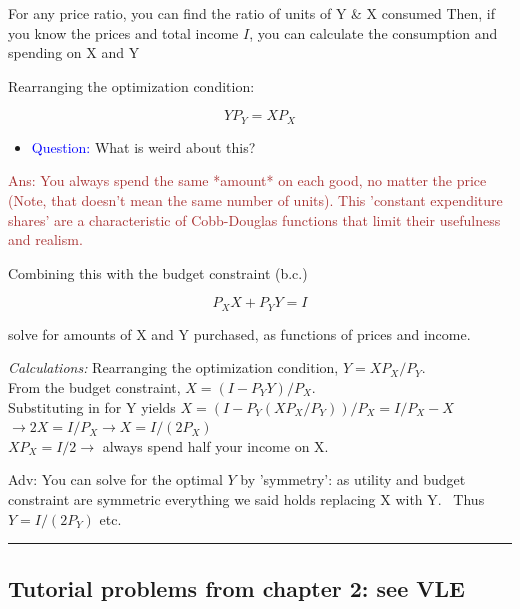 \documentclass[]{article}
\providecommand{\tightlist}{%
  \setlength{\itemsep}{0pt}\setlength{\parskip}{0pt}}
\begin{document}
\bigskip

For any price ratio, you can find the ratio of units of Y \& X consumed
Then, if you know the prices and total income \(I\), you can calculate the consumption and spending on X and Y

\bigskip

Rearranging the optimization condition:

\[Y P_Y = X P_X\]

\begin{itemize}
\tightlist
\item
  \textcolor{blue}{Question:} What is weird about this?
\end{itemize}

\textcolor{brown}{Ans: You always spend the same *amount* on each good, no matter the price (Note, that doesn't mean the same number of units). This 'constant expenditure shares' are a characteristic of Cobb-Douglas functions that limit their usefulness and realism.}

\bigskip

Combining this with the budget constraint (b.c.)

\[P_X X + P_Y Y = I\]

solve for amounts of X and Y purchased, as functions of prices and income.

\emph{Calculations:}
Rearranging the optimization condition, \(Y = X P_X/P_Y\).\\
From the budget constraint, \(X = (I - P_Y Y)/P_X\).\\

Substituting in for Y yields \(X = (I - P_Y(X P_X / P_Y))/P_X = I/P_X - X\)\\
\(\rightarrow 2X = I/P_X \rightarrow X = I/(2P_X)\)\\
\(X P_X = I / 2 \rightarrow\) always spend half your income on X.\\

\medskip

\textcolor{RawSienna}{Adv: You can solve for the optimal $Y$ by 'symmetry': as utility
and budget constraint are symmetric everything we said holds replacing X with Y. \
Thus $Y = I/(2P_Y)$ etc. }

\begin{center}\rule{0.5\linewidth}{\linethickness}\end{center}

\hypertarget{tutorial-problems-from-chapter-2-see-vle}{%
\subsection{Tutorial problems from chapter 2: see VLE}\label{tutorial-problems-from-chapter-2-see-vle}}
\end{document}
